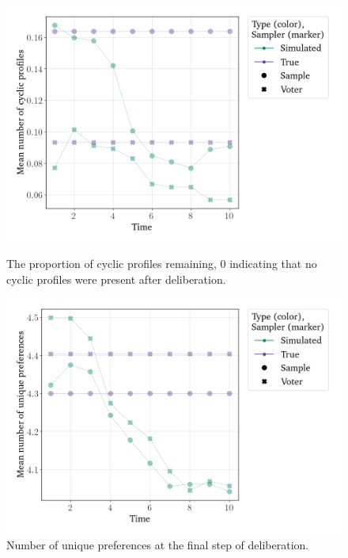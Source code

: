 \begin{figure}[htbp]
	\centering
	\begin{minipage}{0.45\textwidth}
		\centering
		\includegraphics[width=\textwidth]{Figures/delib_Mean Number of Cyclic Profiles.png}
		\caption{The proportion of cyclic profiles remaining, 0 indicating that no cyclic profiles were present after deliberation.}
		\label{fig:degroot_cyclic}
	\end{minipage}\hfill
	\begin{minipage}{0.45\textwidth}
		\centering
		\vspace{-9pt}
		\includegraphics[width=\textwidth]{Figures/delib_Mean number of Unique Preferences.png}
		\caption{Number of unique preferences at the final step of deliberation.}
		\label{fig:degroot_count}
	\end{minipage}


\end{figure}

